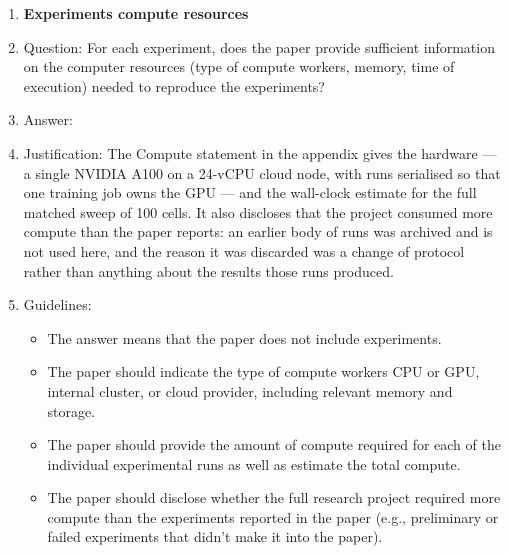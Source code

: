 \begin{enumerate}
\begin{itemize}
        \item It is OK to report 1-sigma error bars, but one should state it. The authors should preferably report a 2-sigma error bar than state that they have a 96\% CI, if the hypothesis of Normality of errors is not verified.
        \item For asymmetric distributions, the authors should be careful not to show in tables or figures symmetric error bars that would yield results that are out of range (e.g., negative error rates).
        \item If error bars are reported in tables or plots, the authors should explain in the text how they were calculated and reference the corresponding figures or tables in the text.
    \end{itemize}

\item {\bf Experiments compute resources}
    \item[] Question: For each experiment, does the paper provide sufficient information on the computer resources (type of compute workers, memory, time of execution) needed to reproduce the experiments?
    \item[] Answer: \answerYes{}
    \item[] Justification: The Compute statement in the appendix gives the hardware --- a single NVIDIA A100 on a 24-vCPU cloud node, with runs serialised so that one training job owns the GPU --- and the wall-clock estimate for the full matched sweep of 100 cells. It also discloses that the project consumed more compute than the paper reports: an earlier body of runs was archived and is not used here, and the reason it was discarded was a change of protocol rather than anything about the results those runs produced.
    \item[] Guidelines:
    \begin{itemize}
        \item The answer \answerNA{} means that the paper does not include experiments.
        \item The paper should indicate the type of compute workers CPU or GPU, internal cluster, or cloud provider, including relevant memory and storage.
        \item The paper should provide the amount of compute required for each of the individual experimental runs as well as estimate the total compute.
        \item The paper should disclose whether the full research project required more compute than the experiments reported in the paper (e.g., preliminary or failed experiments that didn't make it into the paper).
    \end{itemize}


\end{enumerate}
